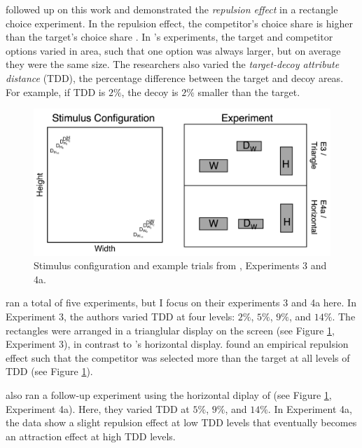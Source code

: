 \textcite{spektorWhenGoodLooks2018b} followed up on this work and demonstrated the \textit{repulsion effect} in a rectangle choice experiment. In the repulsion effect, the competitor's choice share is higher than the target's choice share \parencite{liaoInfluenceDistanceDecoy2021,evansImpactPresentationOrder2021,simonsonVicesVirtuesMisguided2014,frederickLimitsAttraction2014b,spektorRepulsionEffectPreferential2022,banerjeeFactorsThatPromote2024,bhui2021rational}. In \textcite{spektorWhenGoodLooks2018b}'s experiments, the target and competitor options varied in area, such that one option was always larger, but on average they were the same size. The researchers also varied the \textit{target-decoy attribute distance} (TDD), the percentage difference between the target and decoy areas. For example, if TDD is $2\%$, the decoy is $2\%$ smaller than the target. 

\begin{figure}
   \includegraphics[width=\linewidth]{figures/spektor_stim.png}
   \caption{Stimulus configuration and example trials from \textcite{spektorWhenGoodLooks2018b}, Experiments 3 and 4a.}
   \label{fig:spektor_stim}
\end{figure}

\textcite{spektorWhenGoodLooks2018b} ran a total of five experiments, but I focus on their experiments 3 and 4a here. In Experiment 3, the authors varied TDD at four levels: $2\%$, $5\%$, $9\%$, and $14\%$. The rectangles were arranged in a trianglular display on the screen (see Figure \ref{fig:spektor_stim}, Experiment 3), in contrast to \textcite{trueblood2013not}'s horizontal display. \textcite{spektorWhenGoodLooks2018b} found an empirical repulsion effect such that the competitor was selected more than the target at all levels of TDD (see Figure \ref{fig:spektor_stim}). 

\textcite{spektorWhenGoodLooks2018b} also ran a follow-up experiment using the horizontal diplay of \textcite{trueblood2013not} (see Figure \ref{fig:spektor_stim}, Experiment 4a). Here, they varied TDD at $5\%$, $9\%$, and $14\%$. In Experiment 4a, the data show a slight repulsion effect at low TDD levels that eventually becomes an attraction effect at high TDD levels. 

